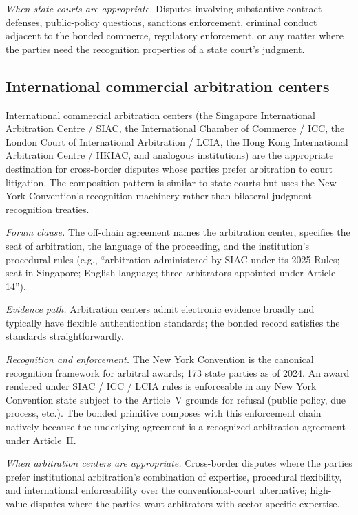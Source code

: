 \documentclass[11pt,a4paper]{article}
\theoremstyle{remark}
\begin{document}
\emph{When state courts are appropriate.} Disputes involving
substantive contract defenses, public-policy questions,
sanctions enforcement, criminal conduct adjacent to the bonded
commerce, regulatory enforcement, or any matter where the parties
need the recognition properties of a state court's judgment.

\subsection{International commercial arbitration centers}

International commercial arbitration centers (the Singapore
International Arbitration Centre / SIAC, the International
Chamber of Commerce / ICC, the London Court of International
Arbitration / LCIA, the Hong Kong International Arbitration
Centre / HKIAC, and analogous institutions) are the appropriate
destination for cross-border disputes whose parties prefer
arbitration to court litigation. The composition pattern is
similar to state courts but uses the New York Convention's
recognition machinery rather than bilateral judgment-recognition
treaties.

\emph{Forum clause.} The off-chain agreement names the
arbitration center, specifies the seat of arbitration, the
language of the proceeding, and the institution's procedural
rules (e.g., ``arbitration administered by SIAC under its 2025
Rules; seat in Singapore; English language; three arbitrators
appointed under Article 14'').

\emph{Evidence path.} Arbitration centers admit electronic
evidence broadly and typically have flexible authentication
standards; the bonded record satisfies the standards
straightforwardly.

\emph{Recognition and enforcement.} The New York Convention
\citep{nyc1958} is the canonical recognition framework for
arbitral awards; 173 state parties as of 2024. An award rendered
under SIAC / ICC / LCIA rules is enforceable in any New York
Convention state subject to the Article~V grounds for refusal
(public policy, due process, etc.). The bonded primitive
composes with this enforcement chain natively because the
underlying agreement is a recognized arbitration agreement
under Article~II.

\emph{When arbitration centers are appropriate.} Cross-border
disputes where the parties prefer institutional arbitration's
combination of expertise, procedural flexibility, and
international enforceability over the conventional-court
alternative; high-value disputes where the parties want
arbitrators with sector-specific expertise.
\end{document}
